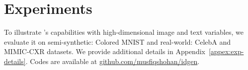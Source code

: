 \documentclass{article}
\newcommand{\idgen}{\text{ID-GEN}\xspace}
\theoremstyle{plain}
\theoremstyle{definition}
\theoremstyle{remark}
\begin{document}
\section{Experiments}
 To illustrate \idgen's capabilities with high-dimensional image and text variables, we evaluate it on semi-synthetic: Colored MNIST and real-world: CelebA and MIMIC-CXR datasets. 
 We provide additional details in Appendix~\ref{appex:exp-details}.
 Codes are available at \href{https://github.com/musfiqshohan/IDGEN}{github.com/musfiqshohan/idgen}.
%
%
%
\end{document}
